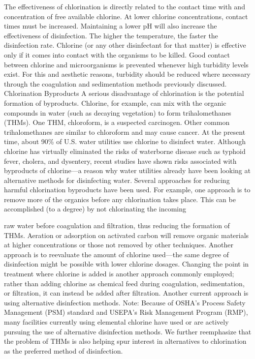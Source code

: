 \documentclass{article}
\begin{document}
The effectiveness of chlorination is directly related to the contact
time with and concentration of free available chlorine. At lower
chlorine concentrations, contact times must be increased. Maintaining a
lower pH will also increase the effectiveness of disinfection. The
higher the temperature, the faster the disinfection rate. Chlorine (or
any other disinfectant for that matter) is effective only if it comes
into contact with the organisms to be killed. Good contact between
chlorine and microorganisms is prevented whenever high turbidity levels
exist. For this and aesthetic reasons, turbidity should be reduced where
necessary through the coagulation and sedimentation methods previously
discussed. Chlorination Byproducts A serious disadvantage of
chlorination is the potential formation of byproducts. Chlorine, for
example, can mix with the organic compounds in water (such as decaying
vegetation) to form trihalomethanes (THMs). One THM, chloroform, is a
suspected carcinogen. Other common trihalomethanes are similar to
chloroform and may cause cancer. At the present time, about 90\% of U.S.
water utilities use chlorine to disinfect water. Although chlorine has
virtually eliminated the risks of waterborne disease such as typhoid
fever, cholera, and dysentery, recent studies have shown risks
associated with byproducts of chlorine---a reason why water utilities
already have been looking at alternative methods for disinfecting water.
Several approaches for reducing harmful chlorination byproducts have
been used. For example, one approach is to remove more of the organics
before any chlorination takes place. This can be accomplished (to a
degree) by not chlorinating the incoming

raw water before coagulation and filtration, thus reducing the formation
of THMs. Aeration or adsorption on activated carbon will remove organic
materials at higher concentrations or those not removed by other
techniques. Another approach is to reevaluate the amount of chlorine
used---the same degree of disinfection might be possible with lower
chlorine dosages. Changing the point in treatment where chlorine is
added is another approach commonly employed; rather than adding chlorine
as chemical feed during coagulation, sedimentation, or filtration, it
can instead be added after filtration. Another current approach is using
alternative disinfection methods. Note: Because of OSHA's Process Safety
Management (PSM) standard and USEPA's Risk Management Program (RMP),
many facilities currently using elemental chlorine have used or are
actively pursuing the use of alternative disinfection methods. We
further reemphasize that the problem of THMs is also helping spur
interest in alternatives to chlorination as the preferred method of
disinfection.
\end{document}
